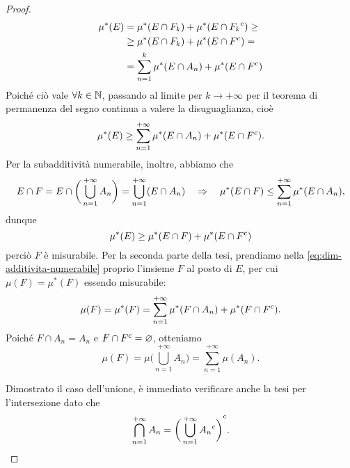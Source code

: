 \begin{proof}
	\begin{equation}
		\begin{split}
			\mu^*(E)&=\mu^*(E\cap F_k)+\mu^*(E\cap{F_k}^c)\geq\\
			&\geq\mu^*(E\cap F_k)+\mu^*(E\cap{F}^c)=\\
			&=\sum_{n=1}^k\mu^*(E\cap A_n)+\mu^*(E\cap{F}^c)
		\end{split}
	\end{equation}
	Poich\'e ciò vale $\forall k\in\mathbb{N}$, passando al limite per $k\to+\infty$ per il teorema di permanenza del segno continua a valere la disuguaglianza, cioè
	\begin{equation}
		\mu^*(E)\geq\sum_{n=1}^{+\infty}\mu^*(E\cap A_n)+\mu^*(E\cap{F}^c).
		\label{eq:dim-additivita-numerabile}
	\end{equation}
	Per la subadditività numerabile, inoltre, abbiamo che
	\begin{equation}
		E\cap F=E\cap\bigg(\bigcup_{n=1}^{+\infty}A_n\bigg)=\bigcup_{n=1}^{+\infty}(E\cap A_n)\quad\Rightarrow\quad\mu^*(E\cap F)\leq\sum_{n=1}^{+\infty}\mu^*(E\cap A_n),
	\end{equation}
	dunque
	\begin{equation}
		\mu^*(E)\geq\mu^*(E\cap F)+\mu^*(E\cap{F}^c)
	\end{equation}
	perciò $F$ è misurabile.
	Per la seconda parte della tesi, prendiamo nella \eqref{eq:dim-additivita-numerabile} proprio l'insieme $F$ al posto di $E$, per cui $\mu(F)=\mu^*(F)$ essendo misurabile:
	\begin{equation}
		\mu(F)=\mu^*(F)=\sum_{n=1}^{+\infty}\mu^*(F\cap A_n)+\mu^*(F\cap{F}^c).
	\end{equation}
	Poich\'e $F\cap A_n=A_n$ e $F\cap{F}^c=\varnothing$, otteniamo
	\begin{equation}
		\mu(F)=\mu\bigg(\bigcup_{n=1}^{+\infty}A_n\bigg)=\sum_{n=1}^{+\infty}\mu(A_n).
	\end{equation}

	Dimostrato il caso dell'unione, è immediato verificare anche la tesi per l'intersezione dato che
	\begin{equation}
		\bigcap_{n=1}^{+\infty}A_n={\bigg(\bigcup_{n=1}^{+\infty}{A_n}^c\bigg)}^c.\qedhere
	\end{equation}
\end{proof}

